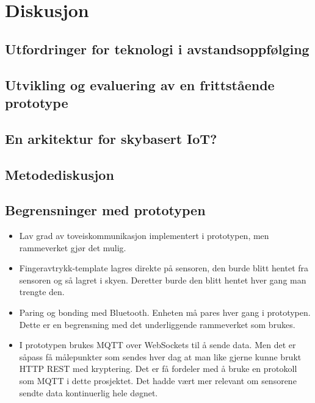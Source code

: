 \chapter{Diskusjon}
\label{ch:discussion}

\section{Utfordringer for teknologi i avstandsoppfølging}

\section{Utvikling og evaluering av en frittstående prototype}

\section{En arkitektur for skybasert IoT?}
%
\section{Metodediskusjon}


\iffalse
\section{Begrensninger med
prototypen}\label{begrensninger-med-prototypen}

\begin{itemize}
\tightlist
\item
  Lav grad av toveiskommunikasjon implementert i prototypen, men rammeverket gjør det mulig.
\item
  Fingeravtrykk-template lagres direkte på sensoren, den burde blitt
  hentet fra sensoren og så lagret i skyen. Deretter burde den blitt
  hentet hver gang man trengte den.
\item
  Paring og bonding med Bluetooth. Enheten må pares hver gang i
  prototypen. Dette er en begrensning med det underliggende rammeverket
  som brukes.
\item
  I prototypen brukes MQTT over WebSockets til å sende data. Men det er
  såpass få målepunkter som sendes hver dag at man like gjerne kunne
  brukt HTTP REST med kryptering. Det er få fordeler med å bruke en
  protokoll som MQTT i dette prosjektet. Det hadde vært mer relevant om
  sensorene sendte data kontinuerlig hele døgnet.
\end{itemize}

